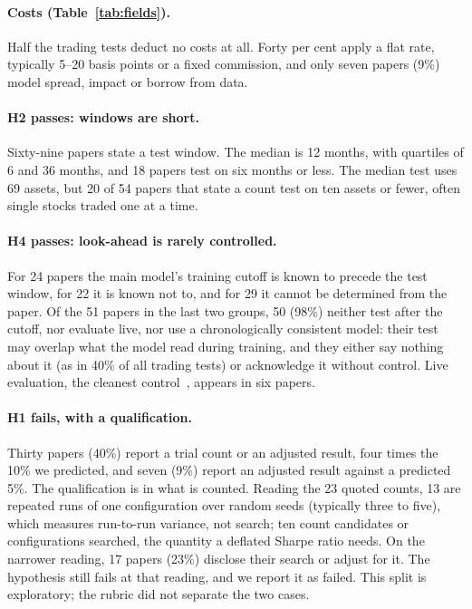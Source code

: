 \documentclass[11pt]{article}
\begin{document}
\paragraph{Costs (Table~\ref{tab:fields}).} Half the trading tests deduct no
costs at all. Forty per cent apply a flat rate, typically 5--20 basis points
or a fixed commission, and only seven papers (9\%) model spread, impact or
borrow from data.

\paragraph{H2 passes: windows are short.} Sixty-nine papers state a test
window. The median is 12 months, with quartiles of 6 and 36 months, and 18
papers test on six months or less. The median test uses 69 assets, but 20 of 54
papers that state a count test on ten assets or fewer, often single stocks
traded one at a time.

\paragraph{H4 passes: look-ahead is rarely controlled.} For 24 papers the
main model's training cutoff is known to precede the test window, for 22 it is
known not to, and for 29 it cannot be determined from the paper. Of the 51
papers in the last two groups, 50 (98\%) neither test after the cutoff, nor
evaluate live, nor use a chronologically consistent model: their test may
overlap what the model read during training, and they either say nothing about
it (as in 40\% of all trading tests) or acknowledge it without control. Live
evaluation, the cleanest
control~\cite{li2025timetravel,chen2026nowcasting}, appears in six papers.

\paragraph{H1 fails, with a qualification.} Thirty papers (40\%) report a
trial count or an adjusted result, four times the 10\% we predicted, and seven
(9\%) report an adjusted result against a predicted 5\%. The qualification is
in what is counted. Reading the 23 quoted counts, 13 are repeated runs of one
configuration over random seeds (typically three to five), which measures run-to-run
variance, not search; ten count candidates or configurations searched, the
quantity a deflated Sharpe ratio needs. On the narrower reading, 17 papers
(23\%) disclose their search or adjust for it. The hypothesis still fails at
that reading, and we report it as failed. This split is exploratory; the
rubric did not separate the two cases.
\end{document}
